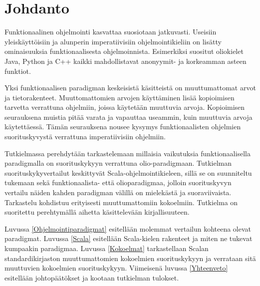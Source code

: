 \chapter{Johdanto} \label{Johdanto}
Funktionaalinen ohjelmointi kasvattaa suosiotaan jatkuvasti. Useisiin yleiskäyttöisiin ja alunperin imperatiivisiin ohjelmointikieliin on lisätty ominaisuuksia funktionaalisesta ohjelmoinnista. Esimerkiksi suositut oliokielet Java, Python ja C++ kaikki mahdollistavat anonyymit- ja korkeamman asteen funktiot. 

Yksi funktionaalisen paradigman keskeisistä käsitteistä on muuttumattomat arvot ja tietorakenteet. Muuttomattomien arvojen käyttäminen lisää kopioimisen tarvetta verrattuna ohjelmiin, joissa käytetään muuttuvia arvoja. Kopioimisen seurauksena muistia pitää varata ja vapauttaa useammin, kuin muuttuvia arvoja käytettäessä. Tämän seurauksena nousee kysymys funktionaalisten ohjelmien suorituskyvystä verrattuna imperatiivisiin ohjelmiin.

Tutkielmassa perehdytään tarkastelemaan millaisia vaikutuksia funktionaalisella paradigmalla on suorituskykyyn verrattuna olio-paradigmaan. Tutkielman suorituskykyvertailut keskittyvät Scala-ohjelmointikieleen, sillä se on suunniteltu tukemaan sekä funktionaalista- että olioparadigmaa, jolloin suorituskyvyn vertailu näiden kahden paradigman välillä on mielekästä ja suoraviivaista. Tarkastelu kohdistuu erityisesti muuttumattomiin kokoelmiin.  Tutkielma on suoritettu perehtymällä aihetta käsittelevään kirjallisuuteen.

Luvussa \ref{Ohjelmointiparadigmat} esitellään molemmat vertailun kohteena olevat paradigmat. Luvussa \ref{Scala} esitellään Scala-kielen rakenteet ja miten ne tukevat kumpaakin paradigmaa. Luvussa \ref{Kokoelmat} tarkastellaan Scalan standardikirjaston muuttumattomien kokoelmien suorituskykyyn ja verrataan sitä muuttuvien kokoelmien suorituskykyyn.  Viimeisenä luvussa \ref{Yhteenveto} esitellään johtopäätökset ja kootaan tutkielman tulokset.
